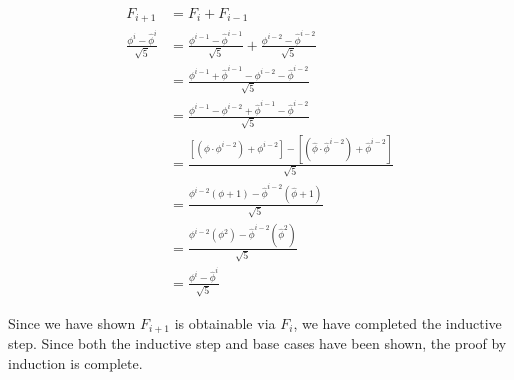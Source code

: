 \begin{align}
	F_{i + 1} &= F_{i} + F_{i - 1} \\
	\frac{\phi^{i} - \hat{\phi}^{i}}{\sqrt{5}} 
	&=  
	\frac{\phi^{i - 1} - \hat{\phi}^{i - 1}}{\sqrt{5}} + 
	\frac{\phi^{i - 2} - \hat{\phi}^{i - 2}}{\sqrt{5}} \\
	&=
	\frac{\phi^{i - 1} + \hat{\phi}^{i - 1} - \phi^{i - 2} - \hat{\phi}^{i - 2}}{\sqrt{5}} \\
	&=
	\frac{\phi^{i - 1} - \phi^{i - 2} + \hat{\phi}^{i - 1} - \hat{\phi}^{i - 2}}{\sqrt{5}} \\
	&=
	\frac{\left[(\phi \cdot \phi^{i -2}) + \phi^{i - 2}\right] - \left[(\hat{\phi} \cdot \hat{\phi}^{i - 2}) + \hat{\phi}^{i - 2}\right]}{\sqrt{5}} \\
	&=
	\frac{\phi^{i - 2} \left( \phi + 1 \right) - \hat{\phi}^{i - 2} \left( \hat{\phi} + 1 \right)}{\sqrt{5}}\\
	&=
	\frac{\phi^{i - 2}\left( \phi^2 \right) - \hat{\phi}^{i - 2} \left( \hat{\phi}^2 \right)}{\sqrt{5}} \\
	&= 
	\frac{\phi^i - \hat{\phi}^i}{\sqrt{5}}
\end{align}

Since we have shown $F_{i + 1}$ is obtainable via $F_i$, we have completed the inductive step. Since both the inductive step and base cases have been shown, the proof by induction is complete.
